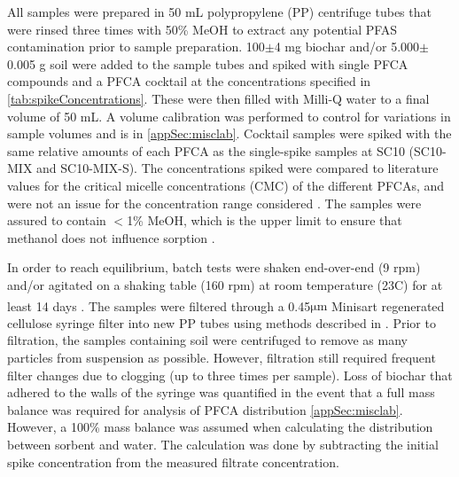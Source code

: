 All samples were prepared in 50 mL polypropylene (PP) centrifuge tubes that were rinsed three times with 50\% MeOH to extract any potential PFAS contamination prior to sample preparation. 100$\pm$4 mg biochar and/or 5.000$\pm$0.005 g soil were added to the sample tubes and spiked with single PFCA compounds and a PFCA cocktail at the concentrations specified in \cref{tab:spikeConcentrations}. These were then filled with Milli-Q water to a final volume of 50 mL. A volume calibration was performed to control for variations in sample volumes and is in \cref{appSec:misclab}. Cocktail samples were spiked with the same relative amounts of each PFCA as the single-spike samples at SC10 (SC10-MIX and SC10-MIX-S). The concentrations spiked were compared to literature values for the critical micelle concentrations (CMC) of the different PFCAs, and were not an issue for the concentration range considered \citep{bhhatarai2011,ding2013physicochemical}. The samples were assured to contain $<$1\% MeOH, which is the upper limit to ensure that methanol does not influence sorption \citep{arvaniti2014}.

In order to reach equilibrium, batch tests were shaken end-over-end (9 rpm) and/or agitated on a shaking table (160 rpm) at room temperature (23\textdegree C) for at least 14 days \citep{kupryianchyk2016biochar}. The samples were filtered through a 0.45$\mathrm{\mu m}$ Minisart\textsuperscript{\textregistered} regenerated cellulose syringe filter into new \acrshort{PP} tubes using methods described in \cite{Sorengard2019}. Prior to filtration, the samples containing soil were centrifuged to remove as many particles from suspension as possible. However, filtration still required frequent filter changes due to clogging (up to three times per sample). Loss of biochar that adhered to the walls of the syringe was quantified in the event that a full mass balance was required for analysis of PFCA distribution \cref{appSec:misclab}. However, a 100\% mass balance was assumed when calculating the distribution between sorbent and water. The calculation was done by subtracting the initial spike concentration from the measured filtrate concentration.

